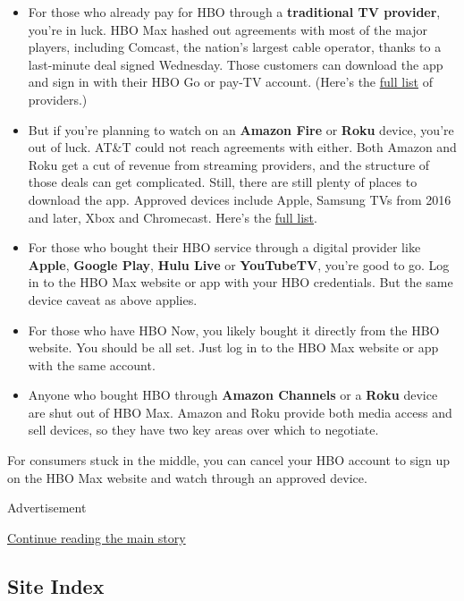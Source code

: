 \begin{itemize}
\item
  For those who already pay for HBO through a \textbf{traditional TV
  provider}, you're in luck. HBO Max hashed out agreements with most of
  the major players, including Comcast, the nation's largest cable
  operator, thanks to a last-minute deal signed Wednesday. Those
  customers can download the app and sign in with their HBO Go or pay-TV
  account. (Here's the
  \href{https://help.hbomax.com/Answer/Detail/2360}{full list} of
  providers.)
\item
  But if you're planning to watch on an \textbf{Amazon Fire} or
  \textbf{Roku} device, you're out of luck. AT\&T could not reach
  agreements with either. Both Amazon and Roku get a cut of revenue from
  streaming providers, and the structure of those deals can get
  complicated. Still, there are still plenty of places to download the
  app. Approved devices include Apple, Samsung TVs from 2016 and later,
  Xbox and Chromecast. Here's the
  \href{https://help.hbomax.com/Answer/Detail/20}{full list}.
\item
  For those who bought their HBO service through a digital provider like
  \textbf{Apple}, \textbf{Google Play}, \textbf{Hulu Live} or
  \textbf{YouTubeTV}, you're good to go. Log in to the HBO Max website
  or app with your HBO credentials. But the same device caveat as above
  applies.
\item
  For those who have HBO Now, you likely bought it directly from the HBO
  website. You should be all set. Just log in to the HBO Max website or
  app with the same account.
\item
  Anyone who bought HBO through \textbf{Amazon Channels} or a
  \textbf{Roku} device are shut out of HBO Max. Amazon and Roku provide
  both media access and sell devices, so they have two key areas over
  which to negotiate.
\end{itemize}

For consumers stuck in the middle, you can cancel your HBO account to
sign up on the HBO Max website and watch through an approved device.

Advertisement

\protect\hyperlink{after-bottom}{Continue reading the main story}

\hypertarget{site-index}{%
\subsection{Site Index}\label{site-index}}

